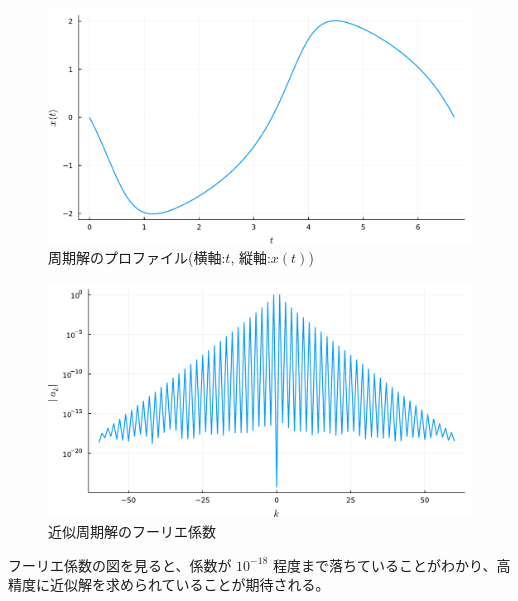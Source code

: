\begin{figure}[h]
	\centering
	\includegraphics[keepaspectratio,scale = 0.35]{05_ODE/solution.pdf}
	\caption{周期解のプロファイル(横軸:$t$, 縦軸:$x(t)$)}
	\label{fig:solution}
\end{figure}

\begin{figure}[h]
	\centering
	\includegraphics[keepaspectratio,scale = 0.35]{05_ODE/coeffs.pdf}
	\caption{近似周期解のフーリエ係数}
	\label{fig:coeffs}
\end{figure}

\clearpage

フーリエ係数の図を見ると、係数が $10^{-18}$ 程度まで落ちていることがわかり、高精度に近似解を求められていることが期待される。



%